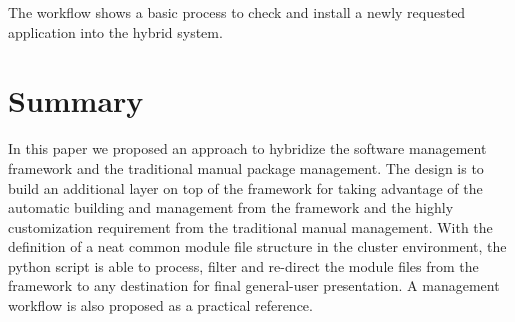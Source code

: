 \documentclass[conference]{IEEEtran}
\begin{document}
The workflow shows a basic process to check and install a newly requested application into the hybrid system. 


\section{Summary} \label{sec_summary}

In this paper we proposed an approach to hybridize the software management framework and the traditional manual package management. The design is to build an additional layer on top of the framework for taking advantage of the automatic building and management from the framework and the highly customization requirement from the traditional manual management. With the definition of a neat common module file structure in the cluster environment, the python script is able to process, filter and re-direct the module files from the framework to any destination for final general-user presentation. A management workflow is also proposed as a practical reference. 
\end{document}
